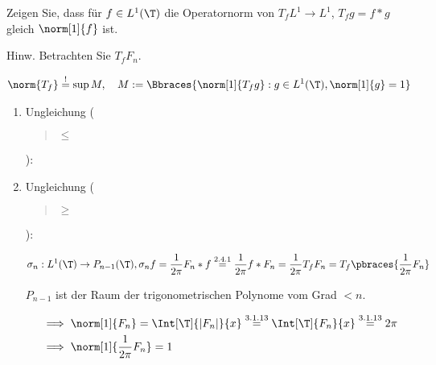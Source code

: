 
\begin{exercise}

Zeigen Sie, dass für $f \in L^1(\T)$ die Operatornorm von $T_f L^1 \to L^1$, $T_f g = f \ast g$ gleich $\norm[1]{f}$ ist.

Hinw.
Betrachten Sie $T_f F_n$.

\end{exercise}


\begin{solution}

\phantom{}

\begin{align*}
    \norm{T_f}
    \stackrel{!}{=}
    \sup M,
    \quad
    M
    :=
    \Bbraces
    {
        \norm[1]{T_f g}:
        g \in L^1(\T),
        \norm[1]{g} = 1
    }
\end{align*}

\begin{enumerate}[label = \arabic*.]

    \item Ungleichung (\blockquote{$\leq$}):


    \item Ungleichung (\blockquote{$\geq$}):
    

    \begin{align*}
        \sigma_n:
        L^1(\T) \to P_{n-1}(\T),
        \sigma_n f
        =
        \frac{1}{2 \pi}
        F_n \ast f
        \stackrel
        {
            \mathrm{2.4.1}
        }{=}
        \frac{1}{2 \pi}
        f \ast F_n
        =
        \frac{1}{2 \pi}
        T_f F_n
        =
        T_f
        \pbraces
        {
            \frac{1}{2 \pi}
            F_n
        }
    \end{align*}

    $P_{n-1}$ ist der Raum der trigonometrischen Polynome vom Grad $< n$.


    \begin{align*}
        & \implies
        \norm[1]{F_n}
        =
        \Int[\T]{|F_n|}{x}
        \stackrel
        {
            \mathrm{3.1.13}
        }{=}
        \Int[\T]{F_n}{x}        
        \stackrel
        {
            \mathrm{3.1.13}
        }{=}
        2 \pi \\
        & \implies
        \norm[1]
        {
            \frac{1}{2 \pi}
            F_n
        }
        =
        1
    \end{align*}
    

\end{enumerate}
\end{solution}
